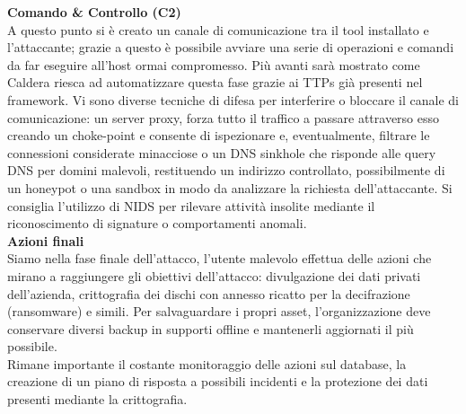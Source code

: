 \noindent
{\bfseries\Large{\textbf{Comando \& Controllo (C2)}}}\\[1em]
A questo punto si è creato un canale di comunicazione tra il tool installato e l'attaccante; grazie a questo è possibile avviare una serie di operazioni e comandi da far eseguire all'host ormai compromesso. Più avanti sarà mostrato come Caldera riesca ad automatizzare questa fase grazie ai TTPs già presenti nel framework. Vi sono diverse tecniche di difesa per interferire o bloccare il canale di comunicazione: un server proxy, forza tutto il traffico a passare attraverso esso creando un choke-point e consente di ispezionare e, eventualmente, filtrare le connessioni considerate minacciose o un DNS sinkhole che risponde alle query DNS per domini malevoli, restituendo un indirizzo controllato, possibilmente di un honeypot o una sandbox in modo da analizzare la richiesta dell'attaccante. Si consiglia l'utilizzo di NIDS per rilevare attività insolite mediante il riconoscimento di signature o comportamenti anomali.\\

\noindent
{\bfseries\Large{\textbf{Azioni finali}}}\\[1em]
Siamo nella fase finale dell'attacco, l'utente malevolo effettua delle azioni che mirano a raggiungere gli obiettivi dell'attacco: divulgazione dei dati privati dell'azienda, crittografia dei dischi con annesso ricatto per la decifrazione (ransomware) e simili. Per salvaguardare i propri asset, l'organizzazione deve conservare diversi backup in supporti offline e mantenerli aggiornati il più possibile.\\
Rimane importante il costante monitoraggio delle azioni sul database, la creazione di un piano di risposta a possibili incidenti e la protezione dei dati presenti mediante la crittografia.

